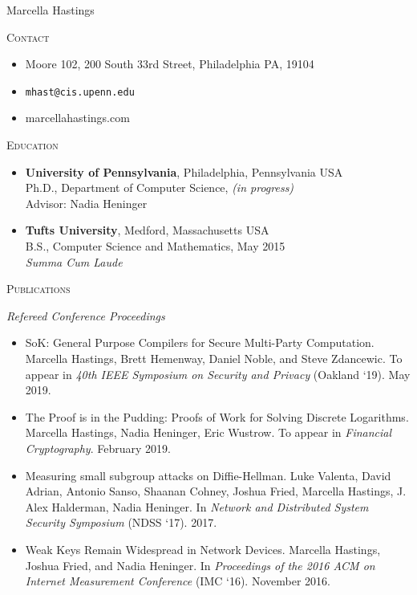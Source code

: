 \documentclass{article}
\begin{document}
Marcella Hastings

\hrulefill

\textsc{Contact}
\begin{itemize}[label={},noitemsep]
  \item Moore 102, 200 South 33rd Street, Philadelphia PA, 19104
  \item \texttt{mhast@cis.upenn.edu}
  \item marcellahastings.com
\end{itemize}

\textsc{Education}
\begin{itemize}[label={}]
  \item \textbf{University of Pennsylvania}, Philadelphia, Pennsylvania USA \\
    Ph.D., Department of Computer Science, \textit{(in progress)}\\
    Advisor: Nadia Heninger \\
    
  \item \textbf{Tufts University}, Medford, Massachusetts USA \\
    B.S., Computer Science and Mathematics, May 2015 \\
    \textit{Summa Cum Laude}
\end{itemize}

\textsc{Publications}

\textit{Refereed Conference Proceedings}
\begin{itemize}[label={}]
\item SoK: General Purpose Compilers for Secure Multi-Party Computation. 
Marcella Hastings, Brett Hemenway, Daniel Noble, and Steve Zdancewic.
To appear in \textit{40th IEEE Symposium on Security and Privacy} (Oakland `19). May 2019.
\item The Proof is in the Pudding: Proofs of Work for Solving Discrete Logarithms.
Marcella Hastings, Nadia Heninger, Eric Wustrow.
To appear in \emph{Financial Cryptography}. February 2019.
\item Measuring small subgroup attacks on Diffie-Hellman. 
Luke Valenta, David Adrian, Antonio Sanso, Shaanan Cohney, Joshua Fried, Marcella Hastings, J. Alex Halderman, Nadia Heninger. 
In \textit{Network and Distributed System Security Symposium} (NDSS `17). 2017.
\item Weak Keys Remain Widespread in Network Devices. 
Marcella Hastings, Joshua Fried, and Nadia Heninger. 
In \textit{Proceedings of the 2016 ACM on Internet Measurement Conference} (IMC `16). November 2016.
\end{itemize}
\end{document}
